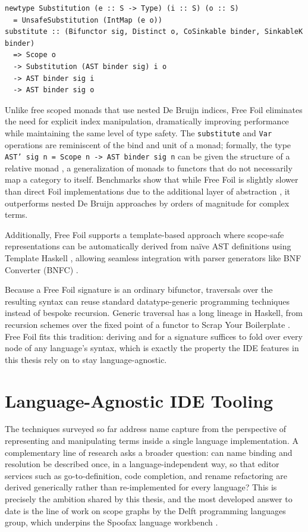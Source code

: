 \begin{verbatim}
newtype Substitution (e :: S -> Type) (i :: S) (o :: S) 
  = UnsafeSubstitution (IntMap (e o))
substitute :: (Bifunctor sig, Distinct o, CoSinkable binder, SinkableK binder) 
  => Scope o 
  -> Substitution (AST binder sig) i o 
  -> AST binder sig i 
  -> AST binder sig o
\end{verbatim}

Unlike free scoped monads that use nested De Bruijn indices, Free Foil eliminates the need for explicit index manipulation, dramatically improving performance while maintaining the same level of type safety. 
The \texttt{substitute} and \texttt{Var} operations are reminiscent of the bind and unit of a monad; formally, the type \texttt{AST' sig n = Scope n -> AST binder sig n} can be given the structure of a relative monad \cite{relativeMonads2015}, a generalization of monads to functors that do not necessarily map a category to itself. 
Benchmarks show that while Free Foil is slightly slower than direct Foil implementations due to the additional layer of abstraction \cite{freefoil2024}, it outperforms nested De Bruijn approaches by orders of magnitude for complex terms.

Additionally, Free Foil supports a template-based approach where scope-safe representations can be automatically derived from naïve AST definitions using Template Haskell \cite{templateHaskell2002}, allowing seamless integration with parser generators like BNF Converter (BNFC) \cite{ForsbergRanta2004}.

Because a Free Foil signature is an ordinary bifunctor, traversals over the resulting syntax can reuse standard datatype-generic programming techniques instead of bespoke recursion. Generic traversal has a long lineage in Haskell, from recursion schemes over the fixed point of a functor \cite{recursionSchemes1991} to Scrap Your Boilerplate \cite{syb2003}. Free Foil fits this tradition: deriving  and  for a signature suffices to fold over every node of any language's syntax, which is exactly the property the IDE features in this thesis rely on to stay language-agnostic.

\section{Language-Agnostic IDE Tooling}
\label{sec:language-agnostic-tooling}

The techniques surveyed so far address name capture from the perspective of representing and manipulating terms inside a single language implementation. 
A complementary line of research asks a broader question: can name binding and resolution be described once, in a language-independent way, so that editor services such as go-to-definition, code completion, and rename refactoring are derived generically rather than re-implemented for every language?
This is precisely the ambition shared by this thesis, and the most developed answer to date is the line of work on scope graphs by the Delft programming languages group, which underpins the Spoofax language workbench \cite{spoofax2010}.

